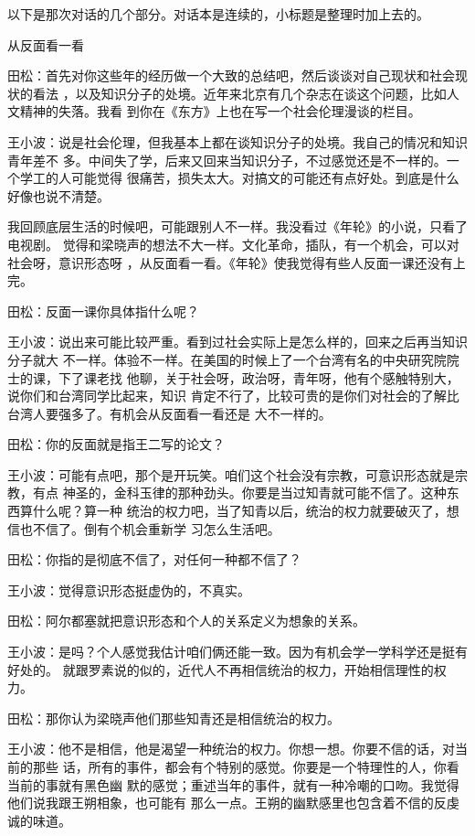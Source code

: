     以下是那次对话的几个部分。对话本是连续的，小标题是整理时加上去的。


从反面看一看


田松：首先对你这些年的经历做一个大致的总结吧，然后谈谈对自己现状和社会现状的看法
，以及知识分子的处境。近年来北京有几个杂志在谈这个问题，比如人文精神的失落。我看
到你在《东方》上也在写一个社会伦理漫谈的栏目。


王小波：说是社会伦理，但我基本上都在谈知识分子的处境。我自己的情况和知识青年差不
多。中间失了学，后来又回来当知识分子，不过感觉还是不一样的。一个学工的人可能觉得
很痛苦，损失太大。对搞文的可能还有点好处。到底是什么好像也说不清楚。


我回顾底层生活的时候吧，可能跟别人不一样。我没看过《年轮》的小说，只看了电视剧。
觉得和梁晓声的想法不大一样。文化革命，插队，有一个机会，可以对社会呀，意识形态呀
，从反面看一看。《年轮》使我觉得有些人反面一课还没有上完。


田松：反面一课你具体指什么呢？


王小波：说出来可能比较严重。看到过社会实际上是怎么样的，回来之后再当知识分子就大
不一样。体验不一样。在美国的时候上了一个台湾有名的中央研究院院士的课，下了课老找
他聊，关于社会呀，政治呀，青年呀，他有个感触特别大，说你们和台湾同学比起来，知识
肯定不行了，比较可贵的是你们对社会的了解比台湾人要强多了。有机会从反面看一看还是
大不一样的。


田松：你的反面就是指王二写的论文？


王小波：可能有点吧，那个是开玩笑。咱们这个社会没有宗教，可意识形态就是宗教，有点
神圣的，金科玉律的那种劲头。你要是当过知青就可能不信了。这种东西算什么呢？算一种
统治的权力吧，当了知青以后，统治的权力就要破灭了，想信也不信了。倒有个机会重新学
习怎么生活吧。


田松：你指的是彻底不信了，对任何一种都不信了？


王小波：觉得意识形态挺虚伪的，不真实。


田松：阿尔都塞就把意识形态和个人的关系定义为想象的关系。


王小波：是吗？个人感觉我估计咱们俩还能一致。因为有机会学一学科学还是挺有好处的。
就跟罗素说的似的，近代人不再相信统治的权力，开始相信理性的权力。


田松：那你认为梁晓声他们那些知青还是相信统治的权力。


王小波：他不是相信，他是渴望一种统治的权力。你想一想。你要不信的话，对当前的那些
话，所有的事件，都会有个特别的感觉。你要是一个特理性的人，你看当前的事就有黑色幽
默的感觉；重述当年的事件，就有一种冷嘲的口吻。我觉得他们说我跟王朔相象，也可能有
那么一点。王朔的幽默感里也包含着不信的反虔诚的味道。


